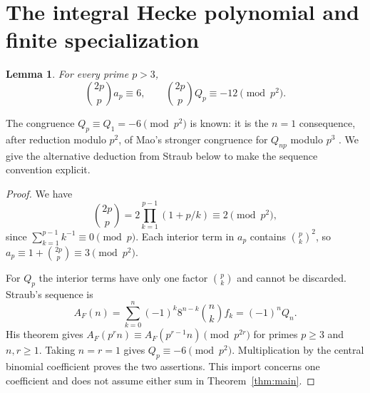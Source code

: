 \documentclass[11pt,a4paper]{article}
\newtheorem{lemma}[theorem]{Lemma}
\theoremstyle{remark}
\begin{document}
\section{The integral Hecke polynomial and finite specialization}\label{sec:hecke}
\begin{lemma}\label{lem:endpoint}
For every prime $p>3$,
\[
 \binom{2p}p a_p\equiv6,\qquad
 \binom{2p}p Q_p\equiv-12\pmod{p^2}.
\]
\end{lemma}
The congruence $Q_p\equiv Q_1=-6\pmod{p^2}$ is known: it is the
$n=1$ consequence, after reduction modulo $p^2$, of Mao's stronger
congruence for $Q_{np}$ modulo $p^3$ \cite[Theorem~1.4]{mao}.
We give the alternative deduction from Straub below to make the
sequence convention explicit.
\begin{proof}
We have
\[
 \binom{2p}p=2\prod_{k=1}^{p-1}(1+p/k)\equiv2\pmod{p^2},
\]
since $\sum_{k=1}^{p-1}k^{-1}\equiv0\pmod p$. Each interior
term in $a_p$ contains $\binom pk^2$, so
$a_p\equiv1+\binom{2p}p\equiv3\pmod{p^2}$.

For $Q_p$ the interior terms have only one factor $\binom pk$ and
cannot be discarded. Straub's sequence
\cite[(10), Theorem~3.2]{straub} is
\[
 A_F(n)=\sum_{k=0}^n(-1)^k8^{n-k}\binom nk f_k=(-1)^nQ_n.
\]
His theorem gives
$A_F(p^rn)\equiv A_F(p^{r-1}n)\pmod{p^{2r}}$ for primes
$p\ge3$ and $n,r\ge1$. Taking $n=r=1$ gives
$Q_p\equiv-6\pmod{p^2}$. Multiplication by the central binomial
coefficient proves the two assertions. This import concerns one
coefficient and does not assume either sum in Theorem~\ref{thm:main}.
\end{proof}
\end{document}
